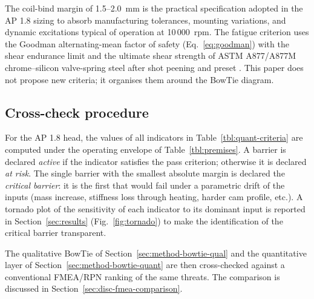 The coil-bind margin of 1.5--2.0~mm is the
practical specification adopted in the AP 1.8 sizing to absorb
manufacturing tolerances, mounting variations, and dynamic excitations
typical of operation at 10\,000~rpm. The fatigue criterion uses the Goodman alternating-mean factor of
safety (Eq.~\ref{eq:goodman}) with the shear endurance limit and the
ultimate shear strength of ASTM A877/A877M chrome--silicon
valve-spring steel after shot peening and preset
\citep{shigley2020,xing2021valvespringEAC,ko2022springfatigueflaws}.
This paper does not propose new criteria; it organises them around the
BowTie diagram.

\subsection{Cross-check procedure}\label{sec:method-cross-check}

For the AP 1.8 head, the values of all indicators in
Table~\ref{tbl:quant-criteria} are computed under the operating envelope
of Table~\ref{tbl:premises}. A barrier is declared \emph{active} if the
indicator satisfies the pass criterion; otherwise it is declared
\emph{at risk}. The single barrier with the smallest absolute margin is
declared the \emph{critical barrier}: it is the first that would fail
under a parametric drift of the inputs (mass increase, stiffness loss
through heating, harder cam profile, etc.). A tornado plot of the
sensitivity of each indicator to its dominant input is reported in
Section~\ref{sec:results} (Fig.~\ref{fig:tornado}) to make the
identification of the critical barrier transparent.

The qualitative BowTie of
Section~\ref{sec:method-bowtie-qual} and the quantitative layer of
Section~\ref{sec:method-bowtie-quant} are then cross-checked against a
conventional FMEA/RPN ranking of the same threats. The comparison is
discussed in Section~\ref{sec:disc-fmea-comparison}.
